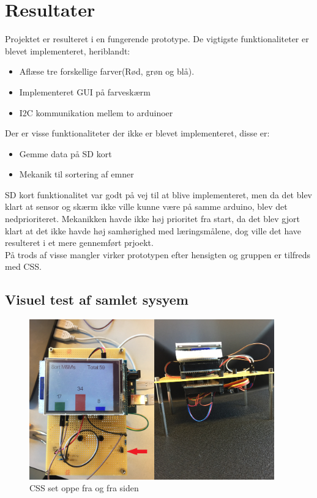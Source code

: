 \graphicspath{{Chapters/CSS_test/}}

\section{Resultater}
Projektet er resulteret i en fungerende prototype. De vigtigste funktionaliteter er blevet implementeret, heriblandt:

\begin{itemize}
	\item Aflæse tre forskellige farver(Rød, grøn og blå).
	
	\item Implementeret GUI på farveskærm
	
	\item I2C kommunikation mellem to arduinoer
	
\end{itemize}

Der er visse funktionaliteter der ikke er blevet implementeret, disse er:

\begin{itemize}
	\item Gemme data på SD kort
	
	\item Mekanik til sortering af emner

\end{itemize}

SD kort funktionalitet var godt på vej til at blive implementeret, men da det blev klart at sensor og skærm ikke ville kunne være på samme arduino, blev det nedprioriteret. Mekanikken havde ikke høj prioritet fra start, da det blev gjort klart at det ikke havde høj samhørighed med læringsmålene, dog ville det have resulteret i et mere gennemført prjoekt.
\\
På trods af visse mangler virker prototypen efter hensigten og gruppen er tilfreds med CSS.

\subsection{Visuel test af samlet sysyem}

\begin{figure}[H]
	\centering
	\includegraphics[width = 300pt]{Img/CSS_top_bottom.jpg}
	\caption{CSS set oppe fra og fra siden}
	\label{fig:CSS_top_bottom}
\end{figure}

